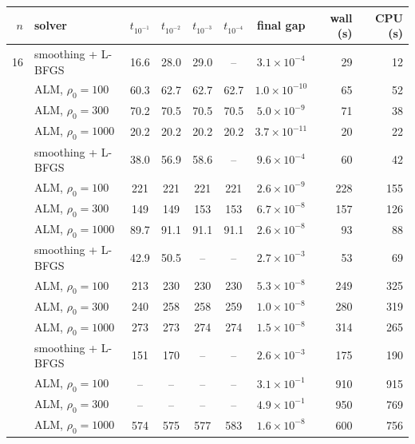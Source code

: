 \begin{tabular}{r l c c c c c r r}\toprule
$n$ & solver & $t_{10^{-1}}$ & $t_{10^{-2}}$ & $t_{10^{-3}}$ & $t_{10^{-4}}$ & final gap & wall (s) & CPU (s) \\\midrule
16 & smoothing + L-BFGS & 16.6 & 28.0 & 29.0 & -- & $3.1\times10^{-4}$ & 29 & 12 \\
 & ALM, $\rho_0=100$ & 60.3 & 62.7 & 62.7 & 62.7 & $1.0\times10^{-10}$ & 65 & 52 \\
 & ALM, $\rho_0=300$ & 70.2 & 70.5 & 70.5 & 70.5 & $5.0\times10^{-9}$ & 71 & 38 \\
 & ALM, $\rho_0=1000$ & 20.2 & 20.2 & 20.2 & 20.2 & $3.7\times10^{-11}$ & 20 & 22 \\
\addlinespace
20 & smoothing + L-BFGS & 38.0 & 56.9 & 58.6 & -- & $9.6\times10^{-4}$ & 60 & 42 \\
 & ALM, $\rho_0=100$ & 221 & 221 & 221 & 221 & $2.6\times10^{-9}$ & 228 & 155 \\
 & ALM, $\rho_0=300$ & 149 & 149 & 153 & 153 & $6.7\times10^{-8}$ & 157 & 126 \\
 & ALM, $\rho_0=1000$ & 89.7 & 91.1 & 91.1 & 91.1 & $2.6\times10^{-8}$ & 93 & 88 \\
\addlinespace
24 & smoothing + L-BFGS & 42.9 & 50.5 & -- & -- & $2.7\times10^{-3}$ & 53 & 69 \\
 & ALM, $\rho_0=100$ & 213 & 230 & 230 & 230 & $5.3\times10^{-8}$ & 249 & 325 \\
 & ALM, $\rho_0=300$ & 240 & 258 & 258 & 259 & $1.0\times10^{-8}$ & 280 & 319 \\
 & ALM, $\rho_0=1000$ & 273 & 273 & 274 & 274 & $1.5\times10^{-8}$ & 314 & 265 \\
\addlinespace
30 & smoothing + L-BFGS & 151 & 170 & -- & -- & $2.6\times10^{-3}$ & 175 & 190 \\
 & ALM, $\rho_0=100$ & -- & -- & -- & -- & $3.1\times10^{-1}$ & 910 & 915 \\
 & ALM, $\rho_0=300$ & -- & -- & -- & -- & $4.9\times10^{-1}$ & 950 & 769 \\
 & ALM, $\rho_0=1000$ & 574 & 575 & 577 & 583 & $1.6\times10^{-8}$ & 600 & 756 \\
\bottomrule\end{tabular}
